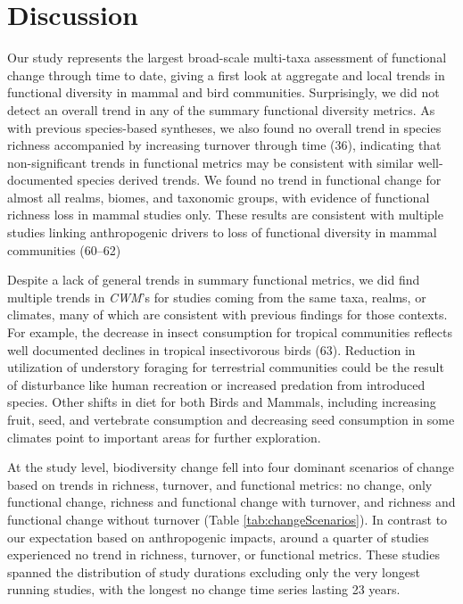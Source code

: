 \documentclass{article}
\begin{document}
\hypertarget{discussion}{%
\section{Discussion}\label{discussion}}

Our study represents the largest broad-scale multi-taxa assessment of
functional change through time to date, giving a first look at aggregate
and local trends in functional diversity in mammal and bird communities.
Surprisingly, we did not detect an overall trend in any of the summary
functional diversity metrics. As with previous species-based syntheses,
we also found no overall trend in species richness accompanied by
increasing turnover through time (36), indicating that non-significant
trends in functional metrics may be consistent with similar
well-documented species derived trends. We found no trend in functional
change for almost all realms, biomes, and taxonomic groups, with
evidence of functional richness loss in mammal studies only. These
results are consistent with multiple studies linking anthropogenic
drivers to loss of functional diversity in mammal communities (60--62)

Despite a lack of general trends in summary functional metrics, we did
find multiple trends in \emph{CWM}'s for studies coming from the same
taxa, realms, or climates, many of which are consistent with previous
findings for those contexts. For example, the decrease in insect
consumption for tropical communities reflects well documented declines
in tropical insectivorous birds (63). Reduction in utilization of
understory foraging for terrestrial communities could be the result of
disturbance like human recreation or increased predation from introduced
species. Other shifts in diet for both Birds and Mammals, including
increasing fruit, seed, and vertebrate consumption and decreasing seed
consumption in some climates point to important areas for further
exploration.

At the study level, biodiversity change fell into four dominant
scenarios of change based on trends in richness, turnover, and
functional metrics: no change, only functional change, richness and
functional change with turnover, and richness and functional change
without turnover (Table \ref{tab:changeScenarios}). In contrast to our
expectation based on anthropogenic impacts, around a quarter of studies
experienced no trend in richness, turnover, or functional metrics. These
studies spanned the distribution of study durations excluding only the
very longest running studies, with the longest no change time series
lasting 23 years.
\end{document}
